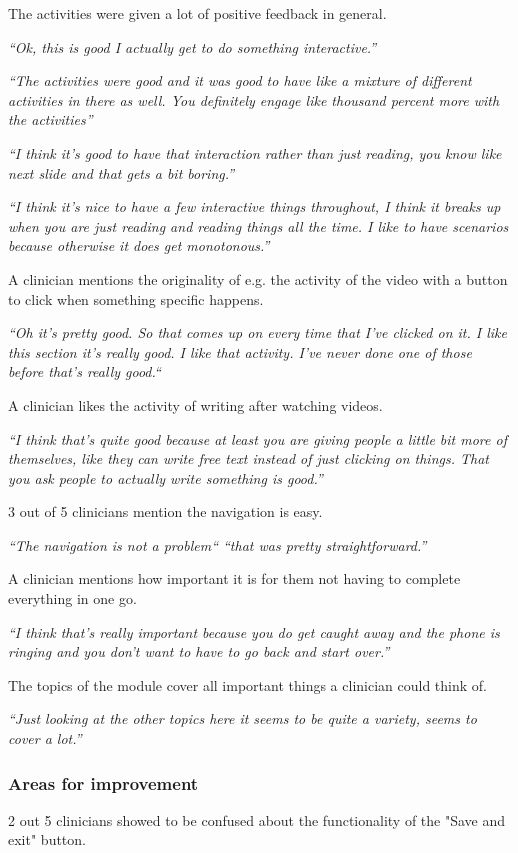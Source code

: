 \documentclass{sigchi}
\begin{document}
The activities were given a lot of positive feedback in general.

\textit{“Ok, this is good I actually get to do something interactive.”} 

\textit{“The activities were good and it was good to have like a mixture of different activities in there as well. You definitely engage like thousand percent more with the activities”}

\textit{“I think it's good to have that interaction rather than just reading, you know like next slide and that gets a bit boring.”}

\textit{“I think it’s nice to have a few interactive things throughout, I think it breaks up when you are just reading and reading things all the time. I like to have scenarios because otherwise it does get monotonous.”}

A clinician mentions the originality of e.g. the activity of the video with a button to click when something specific happens.

\textit{“Oh it’s pretty good. So that comes up on every time that I’ve clicked on it. I like this section it’s really good. I like that activity. I’ve never done one of those before that’s really good.“}

A clinician likes the activity of writing after watching videos.

\textit{“I think that’s quite good because at least you are giving people a little bit more of themselves, like they can write free text instead of just clicking on things. That you ask people to actually write something is good.”}

3 out of 5 clinicians mention the navigation is easy.

\textit{“The navigation is not a problem“ “that was pretty straightforward.”}

A clinician mentions how important it is for them not having to complete everything in one go.

\textit{“I think that’s really important because you do get caught away and the phone is ringing and you don’t want to have to go back and start over.”}

The topics of the module cover all important things a clinician could think of.

\textit{“Just looking at the other topics here it seems to be quite a variety, seems to cover a lot.”}

\subsubsection{Areas for improvement}
2 out 5 clinicians showed to be confused about the functionality of the "Save and exit" button.
\end{document}
